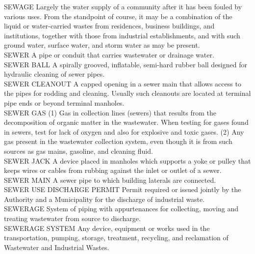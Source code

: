 SEWAGE
Largely the water supply of a community after it has been fouled by various uses. From the standpoint of course, it may be a combination of the liquid or water-carried wastes from residences, business buildings, and institutions, together with those from industrial establishments, and with such ground water, surface water, and storm water as may be present.
\vspace{0.3cm}\\
SEWER
A pipe or conduit that carries wastewater or drainage water. 
\vspace{0.3cm}\\
SEWER BALL
A spirally grooved, inflatable, semi-hard rubber ball designed for hydraulic cleaning of sewer pipes. 
\vspace{0.3cm}\\
SEWER CLEANOUT
A capped opening in a sewer main that allows access to the pipes for rodding and cleaning. Usually such cleanouts are located at terminal pipe ends or beyond terminal manholes. 
\vspace{0.3cm}\\
SEWER GAS
(1) Gas in collection lines (sewers) that results from the decomposition of organic matter in the wastewater. When testing for gases found in sewers, test for lack of oxygen and also for explosive and toxic gases. (2) Any gas present in the wastewater collection system, even though it is from such sources as gas mains, gasoline, and cleaning fluid. 
\vspace{0.3cm}\\
SEWER JACK
A device placed in manholes which supports a yoke or pulley that keeps wires or cables from rubbing against the inlet or outlet of a sewer. 
\vspace{0.3cm}\\
SEWER MAIN
A sewer pipe to which building laterals are connected. 
\vspace{0.3cm}\\
SEWER USE DISCHARGE PERMIT
Permit required or issued jointly by the Authority and a Municipality for the discharge of industrial waste.
\vspace{0.3cm}\\
SEWERAGE
System of piping with appurtenances for collecting, moving and treating wastewater from source to discharge. 
\vspace{0.3cm}\\
SEWERAGE SYSTEM
Any device, equipment or works used in the transportation, pumping, storage, treatment, recycling, and reclamation of Wastewater and Industrial Wastes. 
